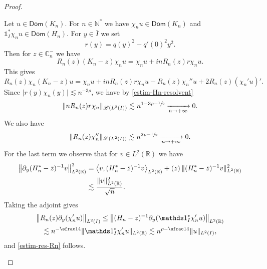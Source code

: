 \documentclass[10pt]{amsart}
\let\mathcal\mathscr
\theoremstyle{plain}
\theoremstyle{definition}
\newcommand {\limt}[2]{\xrightarrow[#1 \to #2]{}}
\newcommand{\abs}[1]{\vert #1\vert}
\newcommand{\nr}[1]{\Vert #1\Vert}
\newcommand{\bnr}[1]{\bigl\Vert #1\bigr\Vert}
\newcommand{\binnp}[2]{\bigl\langle #1 , #2 \bigr\rangle}
\newcommand{\inv}{^{-1}}
\newcommand{\1}{\mathds 1}
\let\Re\relax
\DeclareMathOperator{\Re}{\mathsf{Re}\mkern2mu}
\newcommand{\Dom}{\mathsf{Dom}}
\newcommand{\R}{\mathbb{R}}
\def\C{\mathbb{C}}
\newcommand{\N}{\mathbb{N}}
\let\h\chi
\newcommand{\Lc}{{\mathcal L}}
\begin{document}
\begin{proof}
\begin{itemize}
Let $u \in \Dom(K_n)$. For $n \in \N^*$ we have $\chi_n u \in \Dom(K_n)$ and $\1_I^* \chi_n u \in \Dom(H_n)$. For $y \in \bar I$ we set
\[
r(y) = q(y)^2 - q'(0)^2 y^2.
\]
Then for $z \in \C_n^-$ we have
\[
R_n(z) (K_n-z) \chi_n u = \chi_n u + i n R_n(z) r \chi_n u.
\]
This gives
\begin{equation} \label{eq-K-Rn}
R_n(z) \chi_n (K_n-z) u = \chi_n u + i n R_n(z) r \chi_n u - R_n(z) \chi_n'' u + 2 R_n(z) (\chi_n' u)'.
\end{equation}
Since $\abs{r(y) \h_n(y)} \lesssim n^{-3\rho}$, we have by \eqref{estim-Hn-resolvent}
\begin{equation*}
\nr{n R_n(z) r \h_n}_{\Lc(L^2(I))} \lesssim n^{1 - 3\rho - \sfrac 12} \limt n {+\infty} 0.
\end{equation*}
We also have
\[
\nr{R_n(z) \chi_n''}_{\Lc(L^2(I))} \lesssim n^{2\rho - \sfrac 12} \limt n {+\infty} 0.
\]
For the last term we observe that for $v \in L^2(\R)$ we have
\begin{align*}
\bnr{\partial_y (H_n^*-\bar z)\inv v}_{L^2(\R)}^2
& = \Re \binnp{v}{(H_n^*-\bar z)\inv v}_{L^2(\R)} + \Re(z)\, \nr{(H_n^*-\bar z)\inv v}_{L^2(\R)}^2\\
& \lesssim \frac {\nr{v}_{L^2(\R)}^2}{\sqrt n}.
\end{align*}
Taking the adjoint gives
\begin{multline*}
\bnr{R_n(z) \partial_y (\chi_n' u)}_{L^2(I)} \leq \bnr{(H_n-z)\inv \partial_y (\1_I^* \h_n' u)}_{L^2(\R)}\\
\lesssim n^{-\sfrac 14} \nr{\1_I^* \chi_n'u}_{L^2(\R)} \lesssim n^{\rho-\sfrac 14} \nr{u}_{L^2(I)},
\end{multline*}
and \eqref{estim-res-Rn} follows.


\end{itemize}
\end{proof}
\end{document}
